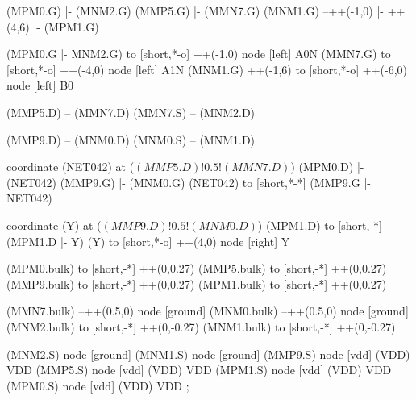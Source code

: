 \begin{circuitikz}[american]
	(MPM0.G) |- (MNM2.G)
	(MMP5.G) |- (MMN7.G)
	(MNM1.G) --++(-1,0) |- ++(4,6) |- (MPM1.G) 
	
	(MPM0.G |- MNM2.G) to [short,*-o] ++(-1,0) node [left] {A0N} 
	(MMN7.G) to [short,*-o] ++(-4,0) node [left] {A1N}
	(MNM1.G) ++(-1,6) to [short,*-o] ++(-6,0) node [left] {B0}
	
	(MMP5.D) -- (MMN7.D)
	(MMN7.S) -- (MNM2.D)
	
	(MMP9.D) -- (MNM0.D)
	(MNM0.S) -- (MNM1.D)
	
	coordinate (NET042) at ($(MMP5.D)!0.5!(MMN7.D)$)
	(MPM0.D) |- (NET042) 
	(MMP9.G) |- (MNM0.G)
	(NET042) to [short,*-*] (MMP9.G |- NET042)
	
	coordinate (Y) at ($(MMP9.D)!0.5!(MNM0.D)$)
	(MPM1.D) to [short,-*] (MPM1.D |- Y)
	(Y) to [short,*-o] ++(4,0) node [right] {Y}
	
	(MPM0.bulk) to [short,-*] ++(0,0.27)
	(MMP5.bulk) to [short,-*] ++(0,0.27)
	(MMP9.bulk) to [short,-*] ++(0,0.27)
	(MPM1.bulk) to [short,-*] ++(0,0.27)
	
	(MMN7.bulk) --++(0.5,0) node [ground]{}
	(MNM0.bulk) --++(0.5,0) node [ground]{}
	(MNM2.bulk) to [short,-*] ++(0,-0.27)	
	(MNM1.bulk) to [short,-*] ++(0,-0.27)


	(MNM2.S) node [ground] {}
	(MNM1.S) node [ground] {}
	(MMP9.S) node [vdd] (VDD) {VDD}
	(MMP5.S) node [vdd] (VDD) {VDD}
	(MPM1.S) node [vdd] (VDD) {VDD}
	(MPM0.S) node [vdd] (VDD) {VDD}
;

\end{circuitikz}
